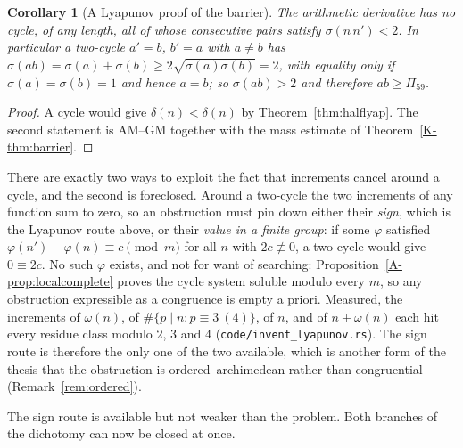 \documentclass[11pt]{article}
\newtheorem{corollary}[theorem]{Corollary}
\theoremstyle{definition}
\begin{document}
\begin{corollary}[A Lyapunov proof of the barrier]\label{cor:lyapbarrier}
The arithmetic derivative has no cycle, of any length, all of whose consecutive pairs satisfy
$\sigma(n\,n')<2$. In particular a two-cycle $a'=b$, $b'=a$ with $a\neq b$ has
$\sigma(ab)=\sigma(a)+\sigma(b)\ge2\sqrt{\sigma(a)\sigma(b)}=2$, with equality only if
$\sigma(a)=\sigma(b)=1$ and hence $a=b$; so $\sigma(ab)>2$ and therefore $ab\ge\Pi_{59}$.
\end{corollary}
\begin{proof}
A cycle would give $\delta(n)<\delta(n)$ by Theorem~\ref{thm:halflyap}. The second statement is
AM--GM together with the mass estimate of Theorem~\ref{K-thm:barrier}.
\end{proof}

There are exactly two ways to exploit the fact that increments cancel around a cycle, and the
second is foreclosed. Around a two-cycle the two increments of any function sum to zero, so an
obstruction must pin down either their \emph{sign}, which is the Lyapunov route above, or their
\emph{value in a finite group}: if some $\varphi$ satisfied
$\varphi(n')-\varphi(n)\equiv c\pmod m$ for all $n$ with $2c\not\equiv0$, a two-cycle would give
$0\equiv2c$. No such $\varphi$ exists, and not for want of searching:
Proposition~\ref{A-prop:localcomplete} proves the cycle system soluble modulo every $m$, so any
obstruction expressible as a congruence is empty a priori. Measured, the increments of
$\omega(n)$, of $\#\{p\mid n:p\equiv3\ (4)\}$, of $n$, and of $n+\omega(n)$ each hit every residue
class modulo $2$, $3$ and $4$ \textup{(\texttt{code/invent\_lyapunov.rs})}. The sign route is
therefore the only one of the two available, which is another form of the thesis that the
obstruction is ordered--archimedean rather than congruential (Remark~\ref{rem:ordered}).

The sign route is available but not weaker than the problem. Both branches of the
dichotomy can now be closed at once.
\end{document}

